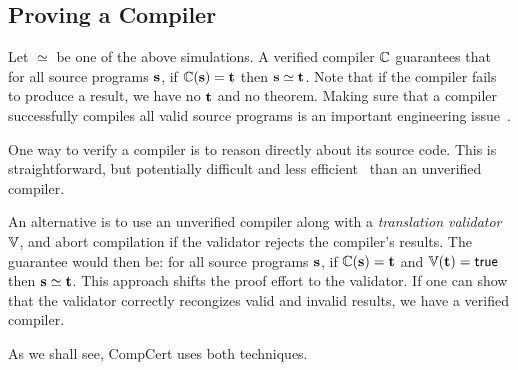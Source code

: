 \subsection{Proving a Compiler}
Let $\simeq$ be one of the above simulations.
A verified compiler $\mathbb{C}$ guarantees that for all source programs $\mathbf{s}$, if $\mathbb{C}(\mathbf{s}) = \mathbf{t}$ then $\mathbf{s} \simeq \mathbf{t}$.
Note that if the compiler fails to produce a result, we have no $\mathbf{t}$ and no theorem.
Making sure that a compiler successfully compiles all valid source programs is an important engineering issue~\cite{l-formally}.

One way to verify a compiler is to reason directly about its source code.
This is straightforward, but potentially difficult and less efficient~\cite{b-size} than an unverified compiler.

An alternative is to use an unverified compiler along with a \emph{translation validator} $\mathbb{V}$, and abort compilation if the validator rejects the compiler's results.
The guarantee would then be: for all source programs $\mathbf{s}$, if $\mathbb{C}(\mathbf{s}) = \mathbf{t}$ and $\mathbb{V}(\mathbf{t}) = \mathsf{true}$ then $\mathbf{s} \simeq \mathbf{t}$.
This approach shifts the proof effort to the validator.
If one can show that the validator correctly recongizes valid and invalid results, we have a verified compiler.

As we shall see, CompCert uses both techniques.


